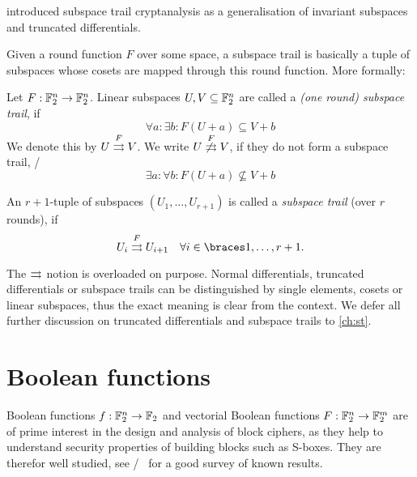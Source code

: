 \textcite{ToSC:GraRecRon16} introduced subspace trail cryptanalysis as a generalisation of invariant subspaces and truncated differentials.

Given a round function $F$ over some space, a subspace trail is basically a tuple of subspaces whose cosets are mapped through this round function.
More formally:
\begin{definition}\label{st:def:subspace-trail}
    Let $F : \mathbb{F}_2^n \to \mathbb{F}_2^n$.
    Linear subspaces $U, V \subseteq \mathbb{F}_2^n$ are called a \emph{(one round) subspace trail}, if
    \begin{equation*}
        \forall a : \exists b : F(U+a) \subseteq V+b
    \end{equation*}
    We denote this by $U \stackrel{F}{\rightrightarrows} V$.
    We write $U \stackrel{F}{\not\rightrightarrows} V$, if they do not form a subspace trail, \ie/
    \begin{equation*}
        \exists a : \forall b : F(U+a) \nsubseteq V+b
    \end{equation*}

    An $r+1$-tuple of subspaces $(U_1, \ldots, U_{r+1})$ is called a \emph{subspace trail} (over $r$ rounds), if
    \begin{equation*}
        \subspacetrail{U_i}{F}{U_{i+1}} \quad \forall i \in \set{1, \ldots, r+1}.
    \end{equation*}
\end{definition}

The $\operatorname*{\rightrightarrows}^{}_{}$ notion is overloaded on purpose.
Normal differentials, truncated differentials or subspace trails can be distinguished by single elements, cosets or linear subspaces, thus the exact meaning is clear from the context.
We defer all further discussion on truncated differentials and subspace trails to \cref{ch:st}.

\section{Boolean functions}\label{sec:prelim:bf}
Boolean functions $f : \mathbb{F}_2^n \to \mathbb{F}_2$ and vectorial Boolean functions $F : \mathbb{F}_2^n \to \mathbb{F}_2^m$ are of prime interest in the design and analysis of block ciphers, as they help to understand security properties of building blocks such as S-boxes.
They are therefor well studied, see \eg/~\cite{BMM:Carlet10a,BMM:Carlet10b} for a good survey of known results.


